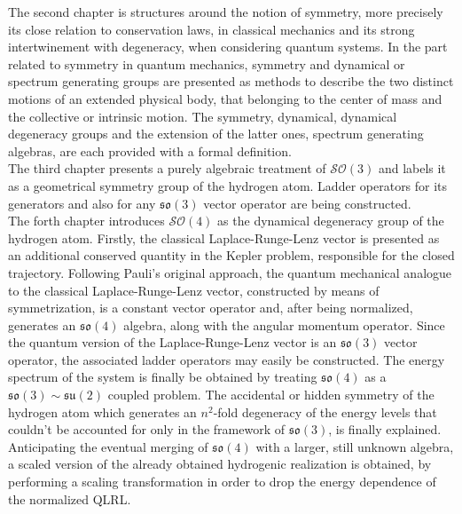 \documentclass[12pt,a4paper]{report}
\theoremstyle{definition}
\theoremstyle{remark}
\theoremstyle{remark}
\begin{document}
The second chapter is structures around the notion of symmetry, more precisely its close relation to conservation laws, in classical mechanics and its strong intertwinement with degeneracy, when considering quantum systems. In the part related to symmetry in quantum mechanics, symmetry and dynamical or spectrum generating groups are presented as methods to describe the two distinct motions of an extended physical body, that belonging to the center of mass and the collective or intrinsic motion. The symmetry, dynamical, dynamical degeneracy groups and the extension of the latter ones, spectrum generating algebras, are each provided with a formal definition. \\ \indent
The third chapter presents a purely algebraic treatment of $\mathcal{SO}(3)$ and labels it as a geometrical symmetry group of the hydrogen atom. Ladder operators for its generators and also for any $\mathfrak{so}(3)$ vector operator are being constructed. \\ \indent
The forth chapter introduces $\mathcal{SO}(4)$ as the dynamical degeneracy group of the hydrogen atom. Firstly, the classical Laplace-Runge-Lenz vector is presented as an additional conserved quantity in the Kepler problem, responsible for the closed trajectory. Following Pauli's original approach, the quantum mechanical analogue to the classical Laplace-Runge-Lenz vector, constructed by means of symmetrization, is a constant vector operator and, after being normalized, generates an $\mathfrak{so}(4)$ algebra, along with the angular momentum operator. Since the quantum version of the Laplace-Runge-Lenz vector is an $\mathfrak{so}(3)$ vector operator, the associated ladder operators may easily be constructed. The energy spectrum of the system is finally be obtained by treating $\mathfrak{so}(4)$ as a $\mathfrak{so}(3)\sim\mathfrak{su}(2)$ coupled problem. The accidental or hidden symmetry of the hydrogen atom which generates an $n^2$-fold degeneracy of the energy levels that couldn't be accounted for only in the framework of $\mathfrak{so}(3)$, is finally explained. Anticipating the eventual merging of $\mathfrak{so}(4)$ with a larger, still unknown algebra, a scaled version of the already obtained hydrogenic realization is obtained, by performing a scaling transformation in order to drop the energy dependence of the normalized QLRL. \\ \indent
\end{document}
